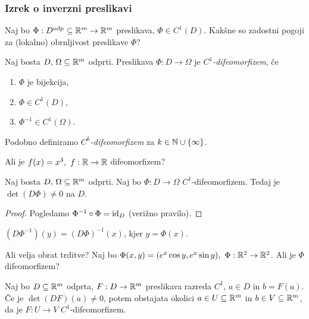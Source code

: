 \subsubsection{Izrek o inverzni preslikavi}
Naj bo $\Phi: D^\text{odp} \subseteq \mathbb{R}^m \to \mathbb{R}^m$ preslikava, $\Phi \in C^1(D)$. Kakšne so zadostni pogoji za (lokalno) obrnljivost preslikave $\Phi$?
\begin{definicija}
    Naj bosta $D, \, \Omega \subseteq \mathbb{R}^m$ odprti. Preslikava $\Phi: D  \to \Omega$ je \emph{$C^1$-difeomorfizem}, če
    \begin{enumerate}
        \item $\Phi$ je bijekcija, 
        \item $\Phi \in C^1(D)$,
        \item $\Phi^{-1} \in C^1(\Omega)$.
    \end{enumerate} 
    Podobno definiramo \emph{$C^k$-difeomorfizem} za $k \in \mathbb{N} \cup \left\{\infty\right\}$.
\end{definicija}

\begin{zgled}
    Ali je $f(x) = x^3, \ f: \mathbb{R} \to \mathbb{R}$ difeomorfizem?
\end{zgled}

\begin{trditev}
    Naj bosta $D, \, \Omega \subseteq \mathbb{R}^m$ odprti. Naj bo $\Phi: D  \to \Omega$ $C^1$-difeomorfizem. Tedaj je $\det(D\Phi) \neq 0$ na $D$. 
\end{trditev}

\begin{proof}
    Pogledamo $\Phi^{-1} \circ \Phi = \operatorname{id}_D$ (verižno pravilo).
\end{proof}

\begin{posledica}
    $(D\Phi^{-1})(y) = (D\Phi)^{-1}(x)$, kjer $y = \Phi(x)$.
\end{posledica}

\begin{zgled}
    Ali velja obrat trditve? 
    Naj bo $\Phi(x,y) = (e^x \cos y, e^x \sin y), \ \Phi: \mathbb{R}^2 \to \mathbb{R}^2$. Ali je $\Phi$ difeomorfizem?
\end{zgled}

\begin{izrek}
    Naj bo $D \subseteq \mathbb{R}^m$ odprta, $F: D \to \mathbb{R}^m$ preslikava razreda $C^1$,  $a \in D$ in $b = F(a)$.
    Če je $\det(DF)(a) \neq 0$, potem obstajata okolici $a \in U \subseteq \mathbb{R}^m$ in $b \in V \subseteq \mathbb{R}^m$, da je $F: U \to V$ $C^1$-difeomorfizem.    
\end{izrek}

